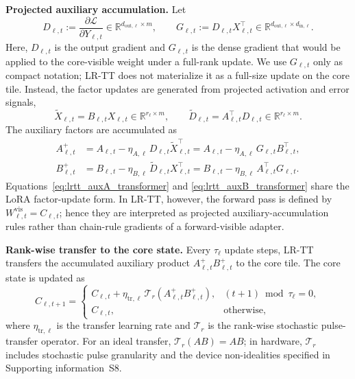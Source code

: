 \documentclass[AMA,LATO2COL]{WileyNJDv5}
\begin{document}
\noindent\textbf{Projected auxiliary accumulation.}
Let
\begin{equation}
D_{\ell,t}
:=
\frac{\partial \mathcal{L}}{\partial Y_{\ell,t}}
\in \mathbb{R}^{d_{\mathrm{out},\ell}\times m},
\qquad
G_{\ell,t}
:=
D_{\ell,t}X_{\ell,t}^{\top}
\in \mathbb{R}^{d_{\mathrm{out},\ell}\times d_{\mathrm{in},\ell}} .
\label{eq:lrtt_layer_grad}
\end{equation}
Here, \(D_{\ell,t}\) is the output gradient and \(G_{\ell,t}\) is the dense gradient that would be applied to the core-visible weight under a full-rank update.
We use \(G_{\ell,t}\) only as compact notation; LR-TT does not materialize it as a full-size update on the core tile.
Instead, the factor updates are generated from projected activation and error signals,
\begin{equation}
\widetilde{X}_{\ell,t}
=
B_{\ell,t}X_{\ell,t}
\in
\mathbb{R}^{r_\ell\times m},
\qquad
\widetilde{D}_{\ell,t}
=
A_{\ell,t}^{\top}D_{\ell,t}
\in
\mathbb{R}^{r_\ell\times m}.
\label{eq:lrtt_projected_signals}
\end{equation}
The auxiliary factors are accumulated as
\begin{align}
A_{\ell,t}^{+}
&=
A_{\ell,t}
-
\eta_{A,\ell}\,D_{\ell,t}\widetilde{X}_{\ell,t}^{\top}
=
A_{\ell,t}
-
\eta_{A,\ell}\,G_{\ell,t}B_{\ell,t}^{\top},
\label{eq:lrtt_auxA_transformer}
\\
B_{\ell,t}^{+}
&=
B_{\ell,t}
-
\eta_{B,\ell}\,\widetilde{D}_{\ell,t}X_{\ell,t}^{\top}
=
B_{\ell,t}
-
\eta_{B,\ell}\,A_{\ell,t}^{\top}G_{\ell,t}.
\label{eq:lrtt_auxB_transformer}
\end{align}
Equations~\eqref{eq:lrtt_auxA_transformer} and \eqref{eq:lrtt_auxB_transformer} share the LoRA factor-update form.
In LR-TT, however, the forward pass is defined by \(W^{\mathrm{vis}}_{\ell,t}=C_{\ell,t}\); hence they are interpreted as projected auxiliary-accumulation rules rather than chain-rule gradients of a forward-visible adapter.


\noindent\textbf{Rank-wise transfer to the core state.}
Every \(\tau_\ell\) update steps, LR-TT transfers the accumulated auxiliary product \(A_{\ell,t}^{+}B_{\ell,t}^{+}\) to the core tile.
The core state is updated as
\begin{equation}
C_{\ell,t+1}
=
\begin{cases}
C_{\ell,t}
+
\eta_{\mathrm{tr},\ell}\,
\mathcal{T}_{r}\!\left(A_{\ell,t}^{+}B_{\ell,t}^{+}\right),
& (t+1)\bmod \tau_\ell=0,\\[4pt]
C_{\ell,t},
& \mathrm{otherwise},
\end{cases}
\label{eq:lrtt_transformer_transfer}
\end{equation}
where \(\eta_{\mathrm{tr},\ell}\) is the transfer learning rate and \(\mathcal{T}_{r}\) is the rank-wise stochastic pulse-transfer operator.
For an ideal transfer, \(\mathcal{T}_{r}(AB)=AB\); in hardware, \(\mathcal{T}_{r}\) includes stochastic pulse granularity and the device non-idealities specified in Supporting information~S8.
\end{document}
